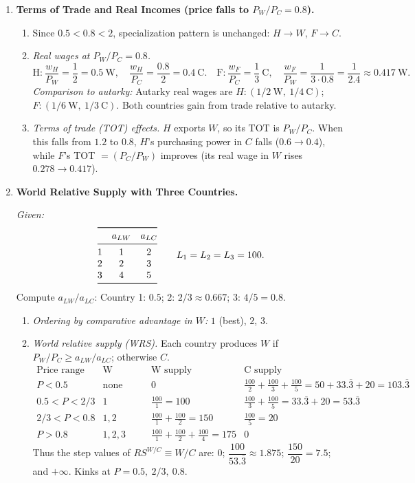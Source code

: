 \documentclass[11pt]{article}
\begin{document}
\begin{enumerate}[leftmargin=*, resume]
\item \textbf{Terms of Trade and Real Incomes (price falls to $P_W/P_C=0.8$).}
\begin{enumerate}
\item Since $0.5<0.8<2$, specialization pattern is unchanged: $H\to W$, $F\to C$.

\item \emph{Real wages at $P_W/P_C=0.8$.}
\[
\text{H:}\ \frac{w_H}{P_W}=\frac{1}{2}=0.5\ \text{W},\quad
\frac{w_H}{P_C}=\frac{0.8}{2}=0.4\ \text{C}.
\quad
\text{F:}\ \frac{w_F}{P_C}=\frac{1}{3}\ \text{C},\quad
\frac{w_F}{P_W}=\frac{1}{3\cdot 0.8}=\frac{1}{2.4}\approx 0.417\ \text{W}.
\]
\emph{Comparison to autarky:} Autarky real wages are $H:(1/2\ \text{W},\ 1/4\ \text{C})$; $F:(1/6\ \text{W},\ 1/3\ \text{C})$. Both countries gain from trade relative to autarky.

\item \emph{Terms of trade (TOT) effects.} $H$ exports $W$, so its TOT is $P_W/P_C$. When this falls from $1.2$ to $0.8$, $H$'s purchasing power in $C$ falls ($0.6\to 0.4$), while $F$'s TOT $=(P_C/P_W)$ improves (its real wage in $W$ rises $0.278\to 0.417$).
\end{enumerate}

\item \textbf{World Relative Supply with Three Countries.}

\emph{Given:}
\[
\begin{array}{@{}lcc@{}}
\toprule
 & a_{LW} & a_{LC}\\
\midrule
1 & 1 & 2\\
2 & 2 & 3\\
3 & 4 & 5\\
\bottomrule
\end{array}
\qquad L_1=L_2=L_3=100.
\]
Compute $a_{LW}/a_{LC}$: Country 1: $0.5$; 2: $2/3\approx 0.667$; 3: $4/5=0.8$.

\begin{enumerate}
\item \emph{Ordering by comparative advantage in $W$:} $1$ (best), $2$, $3$.

\item \emph{World relative supply (WRS).} Each country produces $W$ if $P_W/P_C\ge a_{LW}/a_{LC}$; otherwise $C$.
\[
\begin{array}{l|c|c|c}
\text{Price range} & \text{W producers} & \text{W supply} & \text{C supply}\\
\hline
P<0.5 & \text{none} & 0 & \frac{100}{2}+\frac{100}{3}+\frac{100}{5}=50+33.\overline{3}+20=103.\overline{3}\\
0.5<P<2/3 & 1 & \frac{100}{1}=100 & \frac{100}{3}+\frac{100}{5}=33.\overline{3}+20=53.\overline{3}\\
2/3<P<0.8 & 1,2 & \frac{100}{1}+\frac{100}{2}=150 & \frac{100}{5}=20\\
P>0.8 & 1,2,3 & \frac{100}{1}+\frac{100}{2}+\frac{100}{4}=175 & 0
\end{array}
\]
Thus the step values of $RS^{W/C}\equiv W/C$ are: $0$; $\dfrac{100}{53.\overline{3}}\approx 1.875$; $\dfrac{150}{20}=7.5$; and $+\infty$.
Kinks at $P=0.5,\ 2/3,\ 0.8$.


\end{enumerate}
\end{enumerate}
\end{document}
